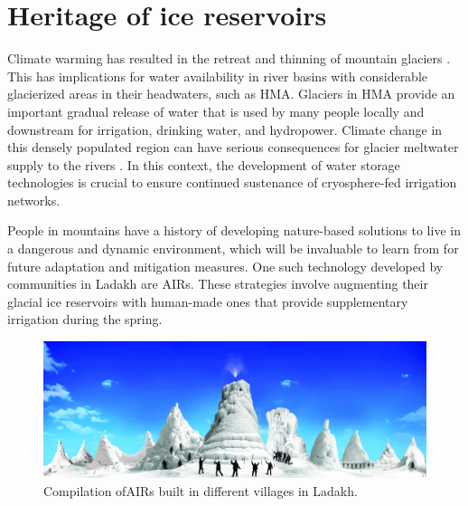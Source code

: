 \chapter{Heritage of ice reservoirs}


Climate warming has resulted in the retreat and thinning of mountain glaciers
\citep{ipccCrossChapterPaperMountains2022}. This has implications for water availability in river basins with considerable glacierized areas in their headwaters, such as \ac{HMA}. Glaciers in \ac{HMA} provide an important
gradual release of water that is used by many people locally and downstream for irrigation, drinking water, and
hydropower. Climate change in this densely populated region can have serious consequences for glacier meltwater
supply to the rivers \citep{immerzeelImportanceVulnerabilityWorld2020}. In this context, the development of
water storage technologies is crucial to ensure continued sustenance of cryosphere-fed irrigation networks.

People in mountains have a history of developing nature-based solutions to live in a dangerous and dynamic
environment, which will be invaluable to learn from for future adaptation and mitigation measures. One such
technology developed by communities in Ladakh are \ac{AIRs}. These strategies involve augmenting their glacial
ice reservoirs with human-made ones that provide supplementary irrigation during the spring.

\begin{figure}[htb]
	\includegraphics[width=\textwidth]{figs/AIRs_Ladakh}
	\caption{Compilation of\ac{AIRs} built in different villages in Ladakh.}
	\label{fig:airs_ladakh}
\end{figure}

